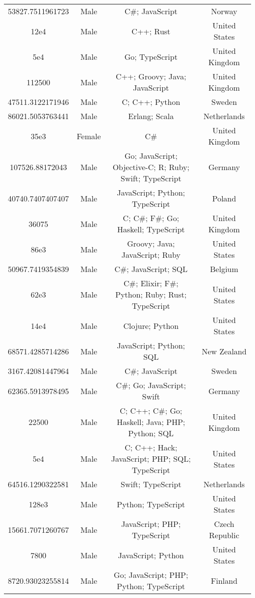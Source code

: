 \begin{center}
\begin{tabular}{ |c|c|c|c| }
53827.7511961723  &  Male  &  C\#; JavaScript  &  Norway  \\ 
12e4  &  Male  &  C++; Rust  &  United States  \\ 
5e4  &  Male  &  Go; TypeScript  &  United Kingdom  \\ 
112500  &  Male  &  C++; Groovy; Java; JavaScript  &  United Kingdom  \\ 
47511.3122171946  &  Male  &  C; C++; Python  &  Sweden  \\ 
86021.5053763441  &  Male  &  Erlang; Scala  &  Netherlands  \\ 
35e3  &  Female  &  C\#  &  United Kingdom  \\ 
107526.88172043  &  Male  &  Go; JavaScript; Objective-C; R; Ruby; Swift; TypeScript  &  Germany  \\ 
40740.7407407407  &  Male  &  JavaScript; Python; TypeScript  &  Poland  \\ 
36075  &  Male  &  C; C\#; F\#; Go; Haskell; TypeScript  &  United Kingdom  \\ 
86e3  &  Male  &  Groovy; Java; JavaScript; Ruby  &  United States  \\ 
50967.7419354839  &  Male  &  C\#; JavaScript; SQL  &  Belgium  \\ 
62e3  &  Male  &  C\#; Elixir; F\#; Python; Ruby; Rust; TypeScript  &  United States  \\ 
14e4  &  Male  &  Clojure; Python  &  United States  \\ 
68571.4285714286  &  Male  &  JavaScript; Python; SQL  &  New Zealand  \\ 
3167.42081447964  &  Male  &  C\#; JavaScript  &  Sweden  \\ 
62365.5913978495  &  Male  &  C\#; Go; JavaScript; Swift  &  Germany  \\ 
22500  &  Male  &  C; C++; C\#; Go; Haskell; Java; PHP; Python; SQL  &  United Kingdom  \\ 
5e4  &  Male  &  C; C++; Hack; JavaScript; PHP; SQL; TypeScript  &  United States  \\ 
64516.1290322581  &  Male  &  Swift; TypeScript  &  Netherlands  \\ 
128e3  &  Male  &  Python; TypeScript  &  United States  \\ 
15661.7071260767  &  Male  &  JavaScript; PHP; TypeScript  &  Czech Republic  \\ 
7800  &  Male  &  JavaScript; Python  &  United States  \\ 
8720.93023255814  &  Male  &  Go; JavaScript; PHP; Python; TypeScript  &  Finland  \\ 

\end{tabular}
\end{center}
